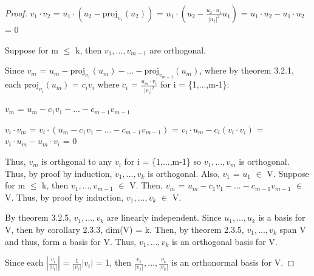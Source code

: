     \begin{proof}
        $v_1 \cdot v_2$
        = $u_1 \cdot (u_2 - \text{proj}_{v_1}(u_2))$
        = $u_1 \cdot (u_2 - \frac{u_2 \cdot u_1}{|u_1|^2}u_1)$
        = $u_1 \cdot u_2 - u_1 \cdot u_2$
        = 0

        Suppose for m $\leq$ k, then $v_1,...,v_{m-1}$ are orthogonal.

        Since $v_m$ =
        $u_m - \text{proj}_{v_1}(u_m) - ... - \text{proj}_{v_{m-1}}(u_m)$, where
        by {\color{red} theorem 3.2.1}, each
        $\text{proj}_{v_i}(u_m)$ = $c_iv_i$
        where $c_i$ = $\frac{u_m \cdot v_i}{|v_i|^2}$
        for i = \{1,...,m-1\}:

        \hspace{0.5cm}
        $v_m$ = $u_m - c_1v_1 - ... - c_{m-1}v_{m-1}$

        \hspace{0.5cm}
        $v_i \cdot v_m$
        = $v_i \cdot (u_m - c_1v_1 - ... - c_{m-1}v_{m-1})$
        = $v_i \cdot u_m - c_i(v_i \cdot v_i)$
        = $v_i \cdot u_m - u_m \cdot v_i$
        = 0

        Thus, $v_m$ is orthgonal to any $v_i$ for i = \{1,...,m-1\}
        so $v_1,...,v_m$ is orthogonal.
        Thus, by proof by induction, $v_1,...,v_k$ is orthogonal.
        Also, $v_1$ = $u_1$ $\in$ V.
        Suppose for m $\leq$ k, then $v_1,...,v_{m-1}$ $\in$ V.
        Then, $v_m$ = $u_m - c_1v_1 - ... - c_{m-1}v_{m-1}$ $\in$ V.
        Thus, by proof by induction, $v_1,...,v_k$ $\in$ V.

        By {\color{red} theorem 3.2.5}, $v_1,...,v_k$
        are linearly independent. Since $u_1,...,u_k$ is a basis for V,
        then by {\color{orange} corollary 2.3.3}, dim(V) = k.
        Then, by {\color{red} theorem 2.3.5}, $v_1,...,v_k$
        span V and thus, form a basis for V.
        Thus, $v_1,...,v_k$ is an orthogonal basis for V.

        Since each $|\frac{v_i}{|v_i|}|$ = $\frac{1}{|v_i|}|v_i|$ = 1,
        then $\frac{v_1}{|v_1|},...,\frac{v_k}{|v_k|}$ is an orthonormal
        basis for V.
    \end{proof}

    \newpage



